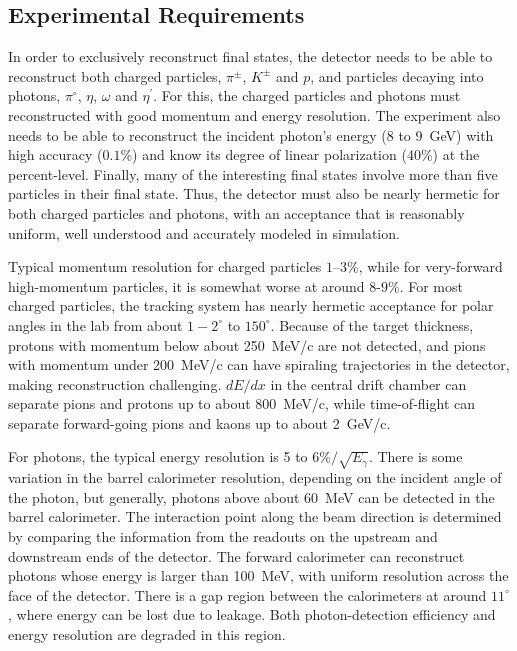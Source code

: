 \subsection[Experimental Requirements]{Experimental Requirements \label{sec:intro:requirements}}
In order to exclusively reconstruct final states, the \gx{} detector needs to be able to reconstruct both charged particles, $\pi^{\pm}$, $K^{\pm}$ and $p$, and particles decaying into photons, $\pi^{\circ}$, $\eta$, $\omega$ and $\eta^{\prime}$. For this, the charged particles and photons must reconstructed with good momentum and energy resolution. The experiment also needs to be able to reconstruct the incident photon's energy (8 to 9~GeV) with high accuracy ($0.1$\%) and know its degree of linear polarization (40\%) at the percent-level. Finally, many of the interesting final states involve more than five particles in their final state. Thus, the \gx{} detector must also be nearly hermetic for both charged particles and photons, with an acceptance that is reasonably uniform, well understood and accurately modeled in simulation.

Typical momentum resolution for charged particles $1$--$3\%$, while for very-forward high-momentum particles, it is somewhat worse at around $8$-$9\%$. For most charged particles, the tracking system has nearly hermetic acceptance for polar angles in the lab from about $1-2^{\circ}$ to $150^{\circ}$. Because of the target thickness, protons with momentum below about 250~MeV/c are not detected, and pions with momentum under 200~MeV/c can have spiraling trajectories in the detector, making reconstruction challenging. $dE/dx$ in the central drift chamber can separate pions and protons up to about 800~MeV/c, while time-of-flight can separate forward-going pions and kaons up to about 2~GeV/c.

For photons, the typical energy resolution is 5 to 6\%$/\sqrt{E_{\gamma}}$. There is some variation in the barrel calorimeter resolution, depending on the incident angle of the photon, but generally, photons above about 60~MeV can be detected in the barrel calorimeter. The interaction point along the beam direction is determined by comparing the information from the readouts on the upstream and downstream ends of the detector. The forward calorimeter can reconstruct photons whose energy is larger than 100~MeV, with uniform resolution across the face of the detector. There is a gap region between the calorimeters at around $11^{\circ}$, where energy can be lost due to leakage. Both photon-detection efficiency and energy resolution are degraded in this region. 
 
